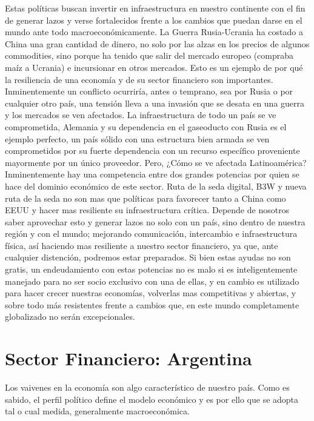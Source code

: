 \documentclass{article}
\begin{document}
\newline
Estas políticas buscan invertir en infraestructura en nuestro continente con el fin de generar lazos y verse fortalecidos frente a los cambios que puedan darse en el mundo ante todo macroeconómicamente. 
\newline
\newline
La Guerra Rusia-Ucrania ha costado a China una gran cantidad de dinero, no solo por las alzas en los precios de algunos commodities, sino porque ha tenido que salir del mercado europeo (compraba maíz a Ucrania) e incursionar en otros mercados. 
\newline
\newline
Esto es un ejemplo de por qué la resiliencia de una economía y de su sector financiero son importantes. Inminentemente un conflicto ocurriría, antes o temprano, sea por Rusia o por cualquier otro país, una tensión lleva a una invasión que se desata en una guerra y los mercados se ven afectados. La infraestructura de todo un país se ve comprometida, Alemania y su dependencia en el gaseoducto con Rusia es el ejemplo perfecto, un país sólido con una estructura bien armada se ven comprometidos por su fuerte dependencia con un recurso específico proveniente mayormente por un único proveedor.
\newline
\newline
Pero, ¿Cómo se ve afectada Latinoamérica? 
Inminentemente hay una competencia entre dos grandes potencias por quien se hace del dominio económico de este sector. Ruta de la seda digital, B3W y nueva ruta de la seda no son mas que políticas para favorecer tanto a China como EEUU y hacer mas resiliente su infraestructura crítica. Depende de nosotros saber aprovechar esto y generar lazos no solo con un país, sino dentro de nuestra región y con el mundo; mejorando comunicación, intercambio e infraestructura física, así haciendo mas resiliente a nuestro sector financiero, ya que, ante cualquier distención, podremos estar preparados. 
\newline
\newline
Si bien estas ayudas no son gratis, un endeudamiento con estas potencias no es malo si es inteligentemente manejado para no ser socio exclusivo con una de ellas, y en cambio es utilizado para hacer crecer nuestras economías, volverlas mas competitivas y abiertas, y sobre todo más resistentes frente a cambios que, en este mundo completamente globalizado no serán excepcionales.




\section{Sector Financiero: Argentina}
Los vaivenes en la economía son algo característico de nuestro país. Como es sabido, el perfil político define el modelo económico y es por ello que se adopta tal o cual medida, generalmente macroeconómica.
\end{document}
